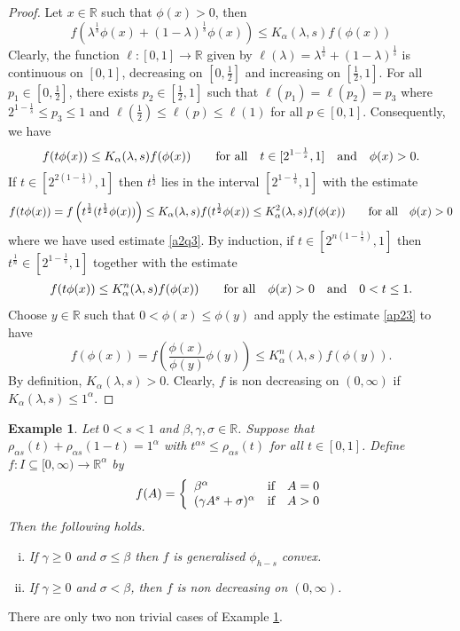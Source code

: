 \documentclass[10pt]{article}
\newtheorem{exa}[theo]{Example}
\begin{document}
\begin{proof}
Let $x\in\mathbb{R}$ such that $\phi(x)>0$, then
\[
f(\lambda^{\frac{1}{s}}\phi(x) + (1-\lambda)^{\frac{1}{s}}\phi(x)) \leq K_{\alpha}(\lambda, s) f(\phi(x))
\]
Clearly, the function $\ell:[0,1]\rightarrow \mathbb{R}$ given by $\ell(\lambda)=\lambda^{\frac{1}{s}}+ (1-\lambda)^{\frac{1}{s}}$ is continuous on $[0,1]$, decreasing on $[0,\frac{1}{2}]$ and increasing on $[\frac{1}{2}, 1]$. For all $p_1\in [0,\frac{1}{2}]$, there exists $p_2\in[\frac{1}{2},1]$ such that $\ell(p_1)= \ell(p_2)=p_3$ where $2^{1-\frac{1}{s}}\leq p_3\leq 1$ and $\ell(\frac{1}{2}) \leq \ell(p)\leq \ell(1)$ for all $p\in[0,1]$. Consequently, we have
\begin{align}
f(t\phi(x)) \leq K_\alpha(\lambda, s) f(\phi(x)) \quad\quad\textnormal{for all} \quad t\in[2^{1-\frac{1}{s}}, 1] \quad\textnormal{and}\quad \phi(x)>0. \label{a2q3}
\end{align}
If $t\in [2^{2\left(1-\frac{1}{s}\right)}, 1]$ then $t^{\frac{1}{2}}$ lies in the interval $[2^{1-\frac{1}{s}}, 1]$ with the estimate
 \[
f(t\phi(x))= f\left(t^{\frac{1}{2}}(t^{\frac{1}{2}}\phi(x))\right) \leq K_\alpha(\lambda, s) f(t^{\frac{1}{2}}\phi(x)) \leq K^2_\alpha(\lambda, s)f(\phi(x)) \quad\quad\textnormal{for all}\quad \phi(x)>0
\]
where we have used estimate \eqref{a2q3}.
By induction, if $t\in [2^{n\left(1-\frac{1}{s}\right)}, 1]$ then $t^{\frac{1}{n}}\in [2^{1-\frac{1}{s}}, 1]$ together with the  estimate
\begin{align}
f(t\phi(x))\leq K_\alpha^n(\lambda, s) f(\phi(x)) \quad\quad\textnormal{for all}\quad \phi(x)>0\quad\textnormal {and}\quad 0< t\leq 1. \label{ap23}
\end{align}
Choose $y\in\mathbb{R}$ such that $0<\phi(x)\leq \phi(y)$  and apply the estimate \eqref{ap23}  to have
\[
f(\phi(x))=f\left(\frac{\phi(x)}{\phi(y)} \phi(y) \right) \leq K^n_\alpha(\lambda, s) f(\phi(y)).
\]
By definition, $K_\alpha(\lambda, s)>0$. Clearly, $f$ is non decreasing on $(0,\infty)$ if $K_\alpha(\lambda, s)\leq1^\alpha$.
\end{proof}


\begin{exa}\label{e1}
Let $0<s<1$ and $\beta, \gamma, \sigma \in \mathbb{R}$. Suppose that $\rho_{\alpha s}(t)+\rho_{\alpha s}(1-t)=1^\alpha$ with $t^{\alpha s} \leq \rho_{\alpha s}(t)$ for all $t\in[0,1]$. Define $f:I\subseteq [0,\infty)\rightarrow \mathbb{R}^\alpha$ by
\[
f(A)= \left\{
\begin{array}{ll}
      \beta^\alpha & \textnormal{if}\quad A=0 \\
      (\gamma A^s +\sigma)^\alpha & \textnormal{if} \quad A>0 \\
\end{array} 
\right.
\]
Then the following holds.
\begin{enumerate}[(i)]
\item If $\gamma \geq 0$ and $\sigma \leq \beta$ then $f$ is generalised $\phi_{h-s}$ convex.
\item If $\gamma \geq 0$ and $\sigma < \beta$, then $f$ is non decreasing on $(0,\infty)$.
\end{enumerate}
\end{exa}
There are only two non trivial cases of Example \ref{e1}.
\end{document}
